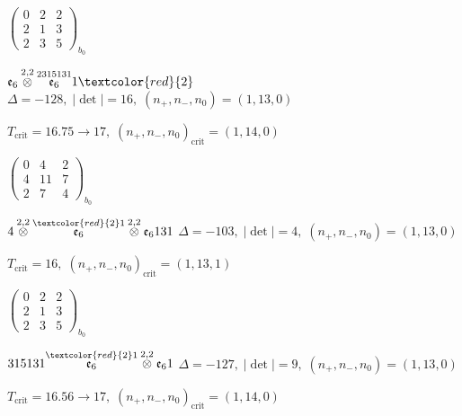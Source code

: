 \documentclass[10pt]{article}
\begin{document}
\hspace{2em}$\left(\begin{smallmatrix}0 & 2 & 2 \\ 2 & 1 & 3 \\ 2 & 3 & 5\end{smallmatrix}\right)_{\!b_0}$

\smallskip

$\mathfrak{e}_6\overset{2,2}{\otimes}\overset{2315131}{\mathfrak{e}_6}1\textcolor{red}{2}$ \quad $\Delta=-128,\; |\det|=16,\; (n_+,n_-,n_0)=(1,13,0)$

\hspace{1em}$T_{\text{crit}}=16.75 \to 17,\; (n_+,n_-,n_0)_{\text{crit}}=(1,14,0)$

\hspace{2em}$\left(\begin{smallmatrix}0 & 4 & 2 \\ 4 & 11 & 7 \\ 2 & 7 & 4\end{smallmatrix}\right)_{\!b_0}$

\smallskip

$4\overset{2,2}{\otimes}\overset{\textcolor{red}{2}1}{\mathfrak{e}_6}\overset{2,2}{\otimes}\mathfrak{e}_6131$ \quad $\Delta=-103,\; |\det|=4,\; (n_+,n_-,n_0)=(1,13,0)$

\hspace{1em}$T_{\text{crit}}=16,\; (n_+,n_-,n_0)_{\text{crit}}=(1,13,1)$

\hspace{2em}$\left(\begin{smallmatrix}0 & 2 & 2 \\ 2 & 1 & 3 \\ 2 & 3 & 5\end{smallmatrix}\right)_{\!b_0}$

\smallskip

$315131\overset{\textcolor{red}{2}1}{\mathfrak{e}_6}\overset{2,2}{\otimes}\mathfrak{e}_61$ \quad $\Delta=-127,\; |\det|=9,\; (n_+,n_-,n_0)=(1,13,0)$

\hspace{1em}$T_{\text{crit}}=16.56 \to 17,\; (n_+,n_-,n_0)_{\text{crit}}=(1,14,0)$
\end{document}
